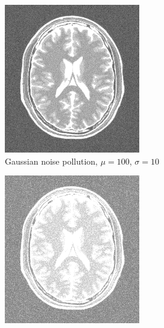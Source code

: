 \documentclass[UTF8]{ctexart}
\begin{document}
\begin{figure}[htbp]
    \vspace{0.5cm}
    \centering
    \begin{subfigure}{0.3\textwidth}
        \centering
        \includegraphics[width=\linewidth]{brain_noised_gaussian.png}
        \caption{Gaussian noise pollution, $\mu=100$, $\sigma=10$}
    \end{subfigure}%
    \hfill
    \begin{subfigure}{0.3\textwidth}
        \centering
        \includegraphics[width=\linewidth]{brain_noised_rayleigh.png}

\end{subfigure}
\end{figure}
\end{document}

